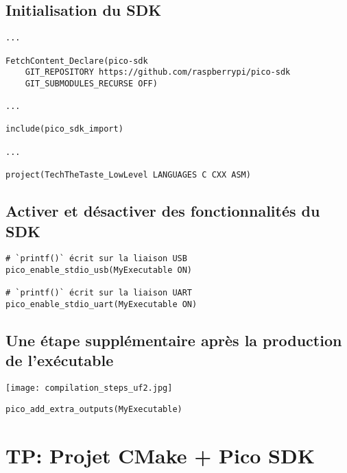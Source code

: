 \documentclass{beamer}
\newenvironment{Frame}{\begin{frame}[containsverbatim]{\subsecname}}{\end{frame}}
\begin{document}
\subsection{Initialisation du SDK}

\begin{Frame}
    \small
    \begin{verbatim}
...

FetchContent_Declare(pico-sdk
    GIT_REPOSITORY https://github.com/raspberrypi/pico-sdk
    GIT_SUBMODULES_RECURSE OFF)

...

include(pico_sdk_import)

...

project(TechTheTaste_LowLevel LANGUAGES C CXX ASM)
    \end{verbatim}
\end{Frame}

\subsection{Activer et désactiver des fonctionnalités du SDK}

\begin{Frame}
    \begin{verbatim}
# `printf()` écrit sur la liaison USB
pico_enable_stdio_usb(MyExecutable ON)

# `printf()` écrit sur la liaison UART
pico_enable_stdio_uart(MyExecutable ON)
    \end{verbatim}
\end{Frame}

\subsection{Une étape supplémentaire après la production de l'exécutable}

\begin{Frame}
    \texttt{[image: compilation\_steps\_uf2.jpg]}
    \begin{verbatim}
pico_add_extra_outputs(MyExecutable)
    \end{verbatim}
\end{Frame}

\section{TP: Projet CMake + Pico SDK}
\end{document}
